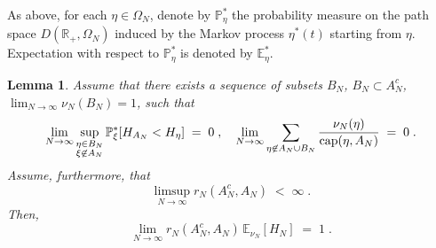 \documentclass[reqno]{amsart}
\newtheorem{lemma}[theorem]{Lemma}
\begin{document}
As above, for each $\eta\in \Omega_N$, denote by ${{\mathbb P}}^*_\eta$ the
probability measure on the path space $D({{\mathbb R}}_+, \Omega_N)$ induced
by the Markov process $\eta^*(t)$ starting from $\eta$. Expectation
with respect to ${{\mathbb P}}^*_\eta$ is denoted by ${{\mathbb E}}^*_\eta$.

\begin{lemma}
\label{s05}
Assume that there exists a sequence of subsets $B_N$, $B_N\subset
A^c_N$, $\lim_{N\to\infty} \nu_N(B_N) = 1$, such that
\begin{equation}
\label{07}
\lim_{N\to\infty} \sup_{\substack{\eta\in B_N \\ \xi\not\in A_N}} 
{{\mathbb P}}^*_{\xi} [ H_{A_N}  < H_\eta ] \;=\; 0\;,
\quad \lim_{N\to\infty} \sum_{\eta\not\in A_N\cup B_N} 
\frac{\nu_N(\eta)} {{{\rm cap}} (\eta, A_N)}\;=\;0\;.
\end{equation}
Assume, furthermore, that
\begin{equation}
\label{25}
\limsup_{N\to\infty} r_N(A_N^c, A_N) \;<\;\infty\;.
\end{equation}
Then,
\begin{equation*}
\lim_{N\to\infty} r_N(A_N^c, A_N)\, {{\mathbb E}}_{\nu_N} [H_N]  
\;=\; 1\;.  
\end{equation*}
\end{lemma}
\end{document}
